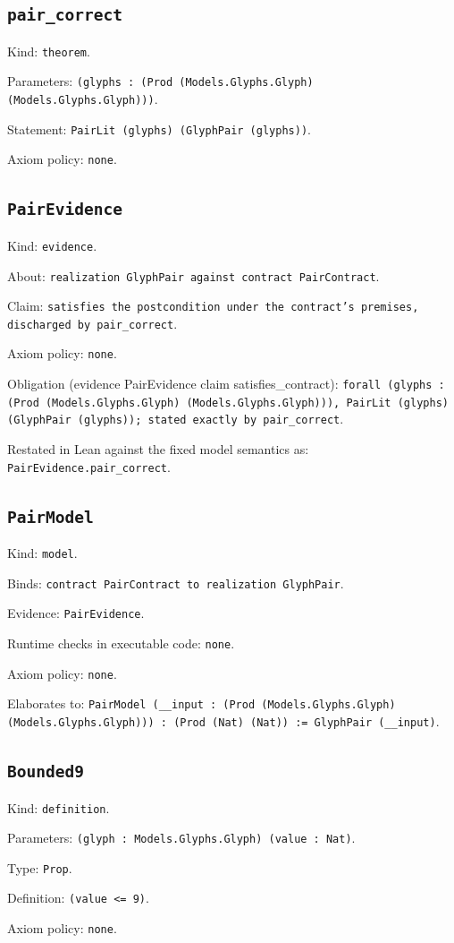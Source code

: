 \documentclass[11pt]{article}
\begin{document}
\subsection*{\texttt{pair\_correct}}
\noindent Kind: \texttt{theorem}.\par
\noindent Parameters: \texttt{(glyphs : (Prod (Models.Glyphs.Glyph) (Models.Glyphs.Glyph)))}.\par
\noindent Statement: \texttt{PairLit (glyphs) (GlyphPair (glyphs))}.\par
\noindent Axiom policy: \texttt{none}.\par
\subsection*{\texttt{PairEvidence}}
\noindent Kind: \texttt{evidence}.\par
\noindent About: \texttt{realization GlyphPair against contract PairContract}.\par
\noindent Claim: \texttt{satisfies the postcondition under the contract's premises, discharged by pair\_correct}.\par
\noindent Axiom policy: \texttt{none}.\par
\noindent Obligation (evidence PairEvidence claim satisfies\_contract): \texttt{forall (glyphs : (Prod (Models.Glyphs.Glyph) (Models.Glyphs.Glyph))), PairLit (glyphs) (GlyphPair (glyphs)); stated exactly by pair\_correct}.\par
\noindent Restated in Lean against the fixed model semantics as: \texttt{PairEvidence.pair\_correct}.\par
\subsection*{\texttt{PairModel}}
\noindent Kind: \texttt{model}.\par
\noindent Binds: \texttt{contract PairContract to realization GlyphPair}.\par
\noindent Evidence: \texttt{PairEvidence}.\par
\noindent Runtime checks in executable code: \texttt{none}.\par
\noindent Axiom policy: \texttt{none}.\par
\noindent Elaborates to: \texttt{PairModel (\_\_input : (Prod (Models.Glyphs.Glyph) (Models.Glyphs.Glyph))) : (Prod (Nat) (Nat)) := GlyphPair (\_\_input)}.\par
\subsection*{\texttt{Bounded9}}
\noindent Kind: \texttt{definition}.\par
\noindent Parameters: \texttt{(glyph : Models.Glyphs.Glyph) (value : Nat)}.\par
\noindent Type: \texttt{Prop}.\par
\noindent Definition: \texttt{(value <= 9)}.\par
\noindent Axiom policy: \texttt{none}.\par
\end{document}
